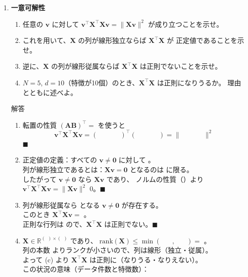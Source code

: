 \documentclass[a4paper,dvipdfmx]{jsarticle}
\newcommand{\提出期限}{2026年10月19日（月）}
\newcommand{\学籍番号}{0000000}
\newcommand{\氏名}{氏名を書く}
\newcommand{\提出日}{2026年10月19日}
\newenvironment{answer}{\begin{itembox}[l]{解答}}{\end{itembox}}
\begin{document}
\begin{enumerate}
  \item \textbf{一意可解性}\quad
    \begin{enumerate}
      \item 任意の $\bm{v}$ に対して $\bm{v}^\top\bm{X}^\top\bm{X}\bm{v} = \|\bm{X}\bm{v}\|^2$
        が成り立つことを示せ。
      \item これを用いて、$\bm{X}$ の列が線形独立ならば $\bm{X}^\top\bm{X}$ が
        正定値であることを示せ。
      \item 逆に、$\bm{X}$ の列が線形従属ならば $\bm{X}^\top\bm{X}$ は正則でないことを示せ。
      \item $N = 5$, $d = 10$（特徴が10個）のとき、$\bm{X}^\top\bm{X}$ は正則になりうるか。
        理由とともに述べよ。
    \end{enumerate}
    \begin{answer}
      \begin{enumerate}
        \item 転置の性質 $(\bm{A}\bm{B})^\top = $ \phantom{XXXXXX} を使うと
          \begin{equation*}
            \bm{v}^\top\bm{X}^\top\bm{X}\bm{v} = (\phantom{XXXX})^\top(\phantom{XXXX}) = \|\phantom{XXXX}\|^2
          \end{equation*}
          \hfill $\blacksquare$
        \item 正定値の定義：すべての $\bm{v} \neq \bm{0}$ に対して \phantom{XXXXXXXXXXXX}。\\
          列が線形独立であるとは：$\bm{X}\bm{v} = \bm{0}$ となるのは \phantom{XXXXXXXX} に限る。\\
          したがって $\bm{v} \neq \bm{0}$ なら $\bm{X}\bm{v}$ \phantom{XXXXXX} であり、
          ノルムの性質（\phantom{XXXXXXXXXX}）より
          $\bm{v}^\top\bm{X}^\top\bm{X}\bm{v} = \|\bm{X}\bm{v}\|^2$ \phantom{XXXX} $0$。\hfill $\blacksquare$
        \item 列が線形従属なら \phantom{XXXXXXXXXXXXXXXX} となる $\bm{v} \neq \bm{0}$ が存在する。\\
          このとき $\bm{X}^\top\bm{X}\bm{v} = $ \phantom{XXXXXX}。\\
          正則な行列は \phantom{XXXXXXXXXXXXXXXXXXXX} ので、$\bm{X}^\top\bm{X}$ は正則でない。\hfill $\blacksquare$
        \item $\bm{X} \in \mathbb{R}^{(\ \ ) \times (\ \ )}$ であり、
          $\mathrm{rank}(\bm{X}) \leq \min(\phantom{XX}, \phantom{XX}) = $ \phantom{XX}。\\
          列の本数 \phantom{XX} よりランクが小さいので、列は線形（独立・従属）。\\
          よって (c) より $\bm{X}^\top\bm{X}$ は正則に（なりうる・なりえない）。\\
          この状況の意味（データ件数と特徴数）：
      \end{enumerate}
    \end{answer}


\end{enumerate}
\end{document}
